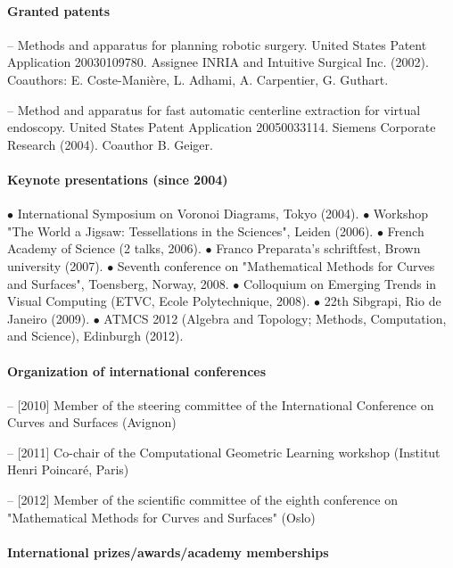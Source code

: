 \paragraph{Granted patents} \mbox{}

-- Methods and apparatus for planning robotic surgery. 
United States Patent Application 20030109780. Assignee INRIA and
Intuitive Surgical Inc. (2002).  Coauthors: E. Coste-Manière, L. Adhami,
A. Carpentier, G. Guthart.

-- Method and apparatus for fast automatic centerline extraction for virtual 
endoscopy. United States Patent Application  20050033114. Siemens Corporate 
Research (2004). Coauthor B. Geiger.

\paragraph{Keynote presentations (since 2004)}\mbox{}

$\bullet$ International Symposium on Voronoi Diagrams, Tokyo (2004).
$\bullet$  Workshop "The World a Jigsaw: Tessellations in the Sciences", Leiden (2006).
$\bullet$  French Academy of Science (2 talks, 2006). 
$\bullet$  Franco Preparata's schriftfest, Brown university (2007). 
$\bullet$ Seventh conference on "Mathematical Methods for Curves and Surfaces", Toensberg, Norway, 2008. 
$\bullet$  Colloquium on Emerging Trends in Visual Computing (ETVC, Ecole Polytechnique, 2008). 
$\bullet$  22th Sibgrapi, Rio de Janeiro (2009).  
$\bullet$  ATMCS 2012 (Algebra and Topology; Methods, Computation, and Science), Edinburgh (2012).




\paragraph{Organization of international conferences} \mbox{}

-- [2010] Member of the steering committee of the International Conference on Curves and Surfaces (Avignon)

-- [2011]  Co-chair of the Computational Geometric Learning workshop (Institut Henri Poincar\'e, Paris)

-- [2012] Member of the scientific committee of the eighth conference on "Mathematical Methods for Curves and Surfaces" (Oslo)


\paragraph{International prizes/awards/academy memberships} \mbox{}

